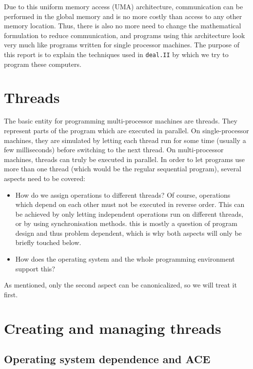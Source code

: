 \documentclass[11pt]{article}
\begin{document}
Due to this uniform memory access (UMA) architecture, communication can be
performed in the global memory and is no more costly than access to any other
memory location. Thus, there is also no more need to change the mathematical
formulation to reduce communication, and programs using this architecture look
very much like programs written for single processor machines. The purpose of
this report is to explain the techniques used in \texttt{deal.II} by which we
try to program these computers.



\section{Threads}

The basic entity for programming multi-processor machines are threads. They
represent parts of the program which are executed in parallel. On
single-processor machines, they are simulated by letting each thread run for
some time (usually a few milliseconds) before switching to the next thread. On
multi-processor machines, threads can truly be executed in parallel. In order
to let programs use more than one thread (which would be the regular
sequential program), several aspects need to be covered:
\begin{itemize}
\item How do we assign operations to different threads? Of course, operations
  which depend on each other must not be executed in reverse order. This can
  be achieved by only letting independent operations run on different threads,
  or by using synchronisation methods. this is mostly a question of program
  design and thus problem dependent, which is why both aspects will only be
  briefly touched below.
\item How does the operating system and the whole programming environment
  support this?
\end{itemize}
As mentioned, only the second aspect can be canonicalized, so we will treat it
first.


\section{Creating and managing threads}

\subsection{Operating system dependence and ACE}
\end{document}
